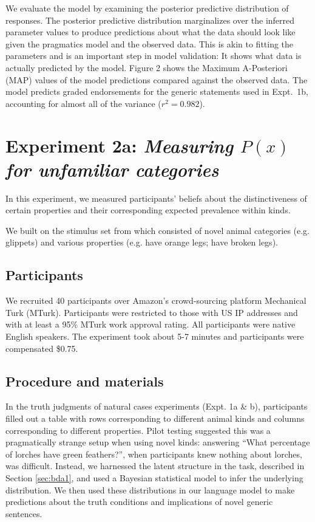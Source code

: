\documentclass[10pt,letterpaper]{article}
\begin{document}
We evaluate the model by examining the posterior predictive distribution of responses. 
The posterior predictive distribution marginalizes over the inferred parameter values to produce predictions about what the data should look like given the pragmatics model and the observed data. 
This is akin to fitting the parameters and is an important step in model validation: It shows what data is actually predicted by the model. 
Figure 2 shows the Maximum A-Posteriori (MAP) values of the model predictions compared against the observed data. 
The model predicts graded endorsements for the generic statements used in Expt.~1b, accounting for almost all of the variance ($r^2 = 0.982$). 


\section{Experiment 2a: \emph{Measuring $P(x)$ for unfamiliar categories}}

In this experiment, we measured participants' beliefs about the distinctiveness of certain properties and their corresponding expected prevalence within kinds.

We built on the stimulus set from  which consisted of novel animal categories (e.g. glippets) and various properties (e.g. have orange legs; have broken legs).


\subsection{Participants}

We recruited 40 participants over Amazon's crowd-sourcing platform Mechanical Turk (MTurk).  
Participants were restricted to those with US IP addresses and with at least a 95\% MTurk work approval rating. 
All participants were native English speakers. 
The experiment took about 5-7 minutes and participants were compensated \$0.75.

\subsection{Procedure and materials}

In the truth judgments of natural cases experiments (Expt. 1a \& b), participants filled out a table with rows corresponding to different animal kinds and columns corresponding to different properties. 
Pilot testing suggested this was a pragmatically strange setup when using novel kinds: answering ``What percentage of lorches have green feathers?'', when participants knew nothing about lorches, was difficult.
Instead, we harnessed the latent structure in the task, described in Section \ref{sec:bda1}, and used a Bayesian statistical model to infer the underlying distribution. 
We then used these distributions in our language model to make predictions about the truth conditions and implications of novel generic sentences.
\end{document}
